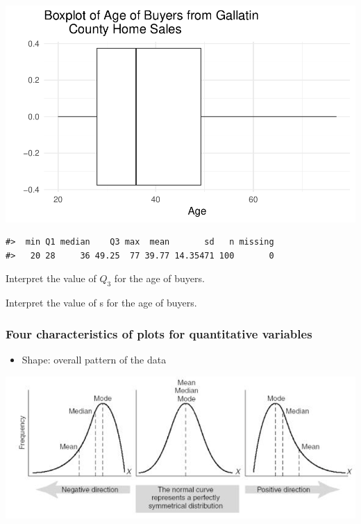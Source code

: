 \documentclass[
]{report}
\newenvironment{Shaded}{\begin{snugshade}}{\end{snugshade}}
\newcommand{\FunctionTok}[1]{\textcolor[rgb]{0.13,0.29,0.53}{\textbf{#1}}}
\newcommand{\NormalTok}[1]{#1}
\newcommand{\SpecialCharTok}[1]{\textcolor[rgb]{0.81,0.36,0.00}{\textbf{#1}}}
\providecommand{\tightlist}{%
  \setlength{\itemsep}{0pt}\setlength{\parskip}{0pt}}
\begin{document}
\begin{center}\includegraphics[width=0.7\linewidth]{06-VN06-EDAonemeanSim_files/figure-latex/unnamed-chunk-4-1} \end{center}

\begin{Shaded}
\end{Shaded}

\begin{verbatim}
#>  min Q1 median    Q3 max  mean       sd   n missing
#>   20 28     36 49.25  77 39.77 14.35471 100       0
\end{verbatim}

Interpret the value of \(Q_3\) for the age of buyers.

\vspace{0.5in}

Interpret the value of s for the age of buyers.

\vspace{0.5in}

\newpage

\subsubsection*{Four characteristics of plots for quantitative variables}\label{four-characteristics-of-plots-for-quantitative-variables}

\begin{itemize}
\tightlist
\item
  Shape: overall pattern of the data
\end{itemize}

\begin{center}\includegraphics[width=0.8\linewidth]{images/shape} \end{center}
\end{document}
